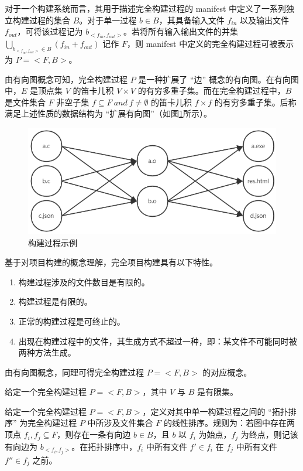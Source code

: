 对于一个构建系统而言，其用于描述完全构建过程的 manifest 中定义了一系列独立构建过程的集合 $B$。对于单一过程 $b \in B$，其具备输入文件 $f_{in}$ 以及输出文件 $f_{out}$，可将该过程记为 $b_{<f_{in}, f_{out}>}$。若将所有输入输出文件的并集 $\bigcup_{b_{<f_{in}, f_{out}>} \in B} (f_{in} + f_{out})$ 记作 $F$，则 manifest 中定义的完全构建过程可被表示为 $P = <F, B>$。

由有向图概念可知，完全构建过程 $P$ 是一种扩展了 “边” 概念的有向图。在有向图中，$E$ 是顶点集 $V$ 的笛卡儿积 $V \times V$ 的有穷多重子集。而在完全构建过程中，$B$ 是文件集合 $F$ 非空子集 $f \subseteq F\ and\ f \neq \emptyset$ 的笛卡儿积 $f \times f$ 的有穷多重子集。后称满足上述性质的数据结构为 “扩展有向图”（如图\ref{fig:build-process}所示）。

\begin{figure}[htb]
    \centering
    \includegraphics[width=.7\textwidth]{figures/build-process.png}
    \caption{构建过程示例}
    \label{fig:build-process}
\end{figure}

基于对项目构建的概念理解，完全项目构建具有以下特性。

\begin{enumerate}
    \item 构建过程涉及的文件数目是有限的。
    \item 构建过程是有限的。
    \item 正常的构建过程是可终止的。
    \item 出现在构建过程中的文件，其生成方式不超过一种，即：某文件不可能同时被两种方法生成。
\end{enumerate}

由有向图概念，同理可得完全构建过程 $P = <F, B>$ 的对应概念。

\begin{lem}
    给定一个完全构建过程 $P = <F, B>$，其中 $V$ 与 $B$ 是有限集。
\end{lem}

\begin{lem}
    给定一个完全构建过程 $P = <F, B>$，定义对其中单一构建过程之间的 “拓扑排序” 为完全构建过程 $P$ 中所涉及文件集合 $F$ 的线性排序。规则为：若图中存在两顶点 $f_i, f_j \subseteq F$，则存在一条有向边 $b \in B$，且 $b$ 以 $f_i$ 为始点，$f_j$ 为终点，则记该有向边为 $b_{<f_i, f_j>}$。在拓扑排序中，$f_i$ 中所有文件 $f' \in f_i$ 在 $f_j$ 中所有文件 $f'' \in f_j$ 之前。
\end{lem}

